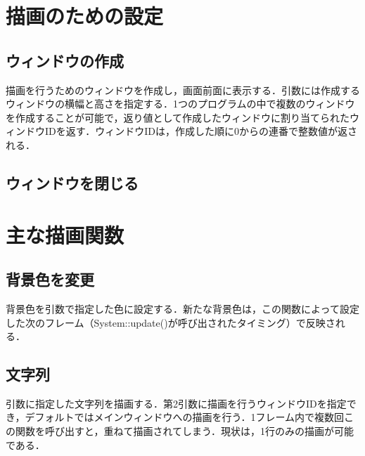 \documentclass[a4paper, 11pt, oneside, onecolumn, openany]{jsarticle}
\begin{document}
\section{描画のための設定}
\subsection{ウィンドウの作成}
描画を行うためのウィンドウを作成し，画面前面に表示する．引数には作成するウィンドウの横幅と高さを指定する．1つのプログラムの中で複数のウィンドウを作成することが可能で，返り値として作成したウィンドウに割り当てられたウィンドウIDを返す．ウィンドウIDは，作成した順に0からの連番で整数値が返される．

\subsection{ウィンドウを閉じる}


\section{主な描画関数}
\subsection{背景色を変更}
背景色を引数で指定した色に設定する．新たな背景色は，この関数によって設定した次のフレーム（System::update()が呼び出されたタイミング）で反映される．

\subsection{文字列}
引数に指定した文字列を描画する．第2引数に描画を行うウィンドウIDを指定でき，デフォルトではメインウィンドウへの描画を行う．1フレーム内で複数回この関数を呼び出すと，重ねて描画されてしまう．現状は，1行のみの描画が可能である．
\end{document}
